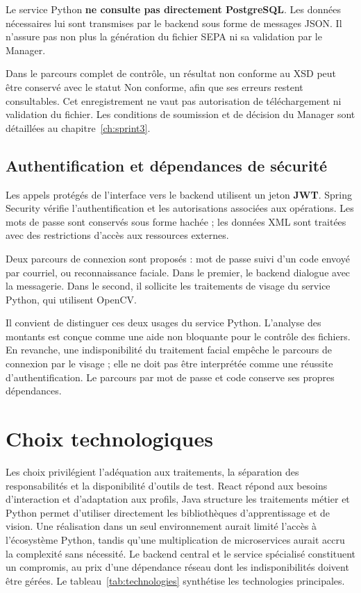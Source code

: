 Le service Python \textbf{ne consulte pas directement PostgreSQL}. Les données nécessaires lui sont transmises par le backend sous forme de messages JSON. Il n'assure pas non plus la génération du fichier SEPA ni sa validation par le Manager.

Dans le parcours complet de contrôle, un résultat non conforme au XSD peut être conservé avec le statut \og Non conforme\fg{}, afin que ses erreurs restent consultables. Cet enregistrement ne vaut pas autorisation de téléchargement ni validation du fichier. Les conditions de soumission et de décision du Manager sont détaillées au chapitre~\ref{ch:sprint3}.

\subsection{Authentification et dépendances de sécurité}

Les appels protégés de l'interface vers le backend utilisent un jeton \textbf{JWT}. Spring Security vérifie l'authentification et les autorisations associées aux opérations. Les mots de passe sont conservés sous forme hachée ; les données XML sont traitées avec des restrictions d'accès aux ressources externes.

Deux parcours de connexion sont proposés : mot de passe suivi d'un code envoyé par courriel, ou reconnaissance faciale. Dans le premier, le backend dialogue avec la messagerie. Dans le second, il sollicite les traitements de visage du service Python, qui utilisent OpenCV.

Il convient de distinguer ces deux usages du service Python. L'analyse des montants est conçue comme une aide non bloquante pour le contrôle des fichiers. En revanche, une indisponibilité du traitement facial empêche le parcours de connexion par le visage ; elle ne doit pas être interprétée comme une réussite d'authentification. Le parcours par mot de passe et code conserve ses propres dépendances.

\section{Choix technologiques}

Les choix privilégient l'adéquation aux traitements, la séparation des responsabilités et la disponibilité d'outils de test. React répond aux besoins d'interaction et d'adaptation aux profils, Java structure les traitements métier et Python permet d'utiliser directement les bibliothèques d'apprentissage et de vision. Une réalisation dans un seul environnement aurait limité l'accès à l'écosystème Python, tandis qu'une multiplication de microservices aurait accru la complexité sans nécessité. Le backend central et le service spécialisé constituent un compromis, au prix d'une dépendance réseau dont les indisponibilités doivent être gérées. Le tableau~\ref{tab:technologies} synthétise les technologies principales.

